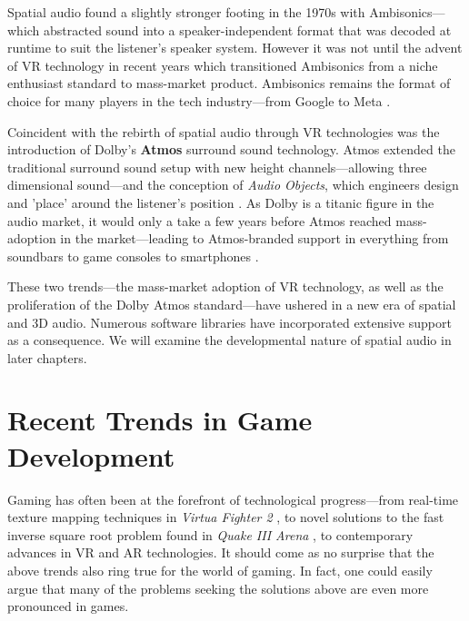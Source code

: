 \documentclass{report}
\newcommand{\tech}[1]{\textbf{#1}}
\begin{document}
Spatial audio found a slightly stronger footing in the 1970s with Ambisonics---which abstracted sound into a speaker-independent format that was decoded at runtime to suit the listener's speaker system. However it was not until the advent of VR technology in recent years which transitioned Ambisonics from a niche enthusiast standard to mass-market product. Ambisonics remains the format of choice for many players in the tech industry---from Google to Meta \cite{Google_2024}\cite{MetaPlatforms2024}. 

Coincident with the rebirth of spatial audio through VR technologies was the introduction of Dolby's \tech{Atmos} surround sound technology. Atmos extended the traditional surround sound setup with new height channels---allowing three dimensional sound---and the conception of \emph{Audio Objects}, which engineers design and 'place' around the listener's position \cite{Dolby_Laboratories_2016}. As Dolby is a titanic figure in the audio market, it would only a take a few years before Atmos reached mass-adoption in the market---leading to Atmos-branded support in everything from soundbars to game consoles to smartphones \cite{Cox_2020}. 

These two trends---the mass-market adoption of VR technology, as well as the proliferation of the Dolby Atmos standard---have ushered in a new era of spatial and 3D audio. Numerous software libraries have incorporated extensive support as a consequence. We will examine the developmental nature of spatial audio in later chapters.   


\section{Recent Trends in Game Development}

Gaming has often been at the forefront of technological progress---from real-time texture mapping techniques in \emph{Virtua Fighter 2} \cite{liboa2020hardware}, to novel solutions to the fast inverse square root problem found in \emph{Quake III Arena} \cite{lomont2003fast}, to contemporary advances in VR and AR technologies. It should come as no surprise that the above trends also ring true for the world of gaming. In fact, one could easily argue that many of the problems seeking the solutions above are even more pronounced in games. 
\end{document}
